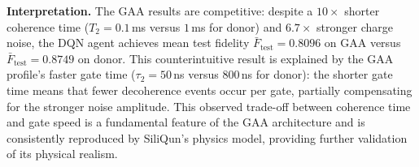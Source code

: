 \begin{table}[ht]
\centering
\caption{Extension~3 results: DQN universal state preparation on
  SiliQun \texttt{gaa\_nominal} profile (all 5 seeds complete).
  No published target exists; this is the first ML benchmark on GAA
  silicon spin qubits.
  $\bar{F}_\text{test}$ = mean test fidelity across 5 seeds;
  $F_\text{train}^\star$ = best training fidelity across 5 seeds.}
\label{tab:e3_results}
\end{table}

\textbf{Interpretation.} The GAA results are competitive: despite
a $10\times$ shorter coherence time ($T_2 = 0.1$\,ms versus $1$\,ms for
donor) and $6.7\times$ stronger charge noise, the DQN agent achieves
mean test fidelity $\bar{F}_\text{test} = 0.8096$ on GAA versus
$\bar{F}_\text{test} = 0.8749$ on donor.
This counterintuitive result is explained by the GAA profile's faster gate
time ($\tau_2 = 50$\,ns versus $800$\,ns for donor): the shorter gate time
means that fewer decoherence events occur per gate, partially compensating
for the stronger noise amplitude.
This observed trade-off between coherence time and gate speed is a
fundamental feature of the GAA architecture and is consistently
reproduced by SiliQun's physics model, providing further validation
of its physical realism.

